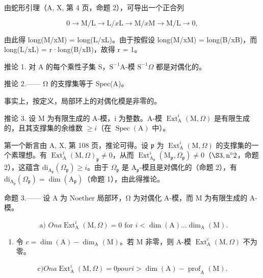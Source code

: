 由蛇形引理（A, X, 第 4 页，命题 2），可导出一个正合列

\[
0 \rightarrow \mathrm{M} / \mathrm{L} \longrightarrow \mathrm{L} / x \mathrm{L} \longrightarrow \mathrm{M} / x \mathrm{M} \longrightarrow \mathrm{M} / \mathrm{L} \rightarrow 0,
\]

由此得 long(M/xM) = long(L/xL)。由于按假设 long(M/xM) = long(B/xB)，而 long(L/xL) = r·long(B/xB)，故得 r = 1。

推论 1. 对 A 的每个乘性子集 S，\(\mathrm{S}^{-1}\mathrm{A}\)-模 \(\mathrm{S}^{-1}\Omega\) 都是对偶化的。

推论 2.—— Ω 的支撑集等于 Spec(A)。

事实上，按定义，局部环上的对偶化模是非零的。

推论 3. 设 M 为有限生成的 A-模，i 为整数。A-模 \(\operatorname{Ext}_{\mathrm{A}}^{i}(\mathrm{M},\Omega)\) 是有限生成的，且其支撑集的余维数 \(\geqslant i\)（在 \(\operatorname{Spec}(\mathrm{A})\) 中）。

第一个断言由 A, X, 第 108 页，推论可得。设 \(\mathfrak{p}\) 为 \(\operatorname{Ext}_{\mathrm{A}}^{i}(\mathrm{M},\Omega)\) 的支撑集的一个素理想。有 \(\operatorname{Ext}_{\mathrm{A}}^{i}(\mathrm{M},\Omega)_{\mathfrak{p}} \neq 0\)，从而 \(\operatorname{Ext}_{\mathrm{A}_{\mathfrak{p}}}^{i}(\mathrm{M}_{\mathfrak{p}},\Omega_{\mathfrak{p}}) \neq 0\)（\(\S 3, \mathrm{n}^{\circ}2\)，命题 2），这蕴含 \(\mathrm{di}_{\mathrm{A}_{\mathfrak{p}}}(\Omega_{\mathfrak{p}}) \geqslant i\)。由于 \(\Omega_{\mathfrak{p}}\) 是 \(\mathrm{A}_{\mathfrak{p}}\)-模且是对偶化的（命题 2），有 \(\mathrm{di}_{\mathrm{A}_{\mathfrak{p}}}(\Omega_{\mathfrak{p}}) = \dim(\mathrm{A}_{\mathfrak{p}})\)（命题 1），由此得推论。

命题 3.—— 设 A 为 Noether 局部环，Ω 为对偶化 A-模，而 M 为有限生成的 A-模。

\[
\text { a) } O n a \operatorname{Ext} _ {\mathrm{A}} ^ {i} (\mathrm{M}, \Omega) = 0 \text { for } i <   \dim (\mathrm{A}) \dots \dim_ {\mathrm{A}} (\mathrm{M}).
\]

\begin{enumerate}
\def\labelenumi{\alph{enumi})}
\setcounter{enumi}{1}
\tightlist
\item
  令 \(c = \dim(\mathrm{A}) - \dim_{\mathrm{A}}(\mathrm{M})\)。若 M 非零，则 A-模 \(\operatorname{Ext}_{\mathrm{A}}^{c}(\mathrm{M}, \Omega)\) 不为零。
\end{enumerate}

\[
\mathrm{c)} O n a \operatorname{Ext} _ {\mathrm{A}} ^ {i} (\mathrm{M}, \Omega) = 0 p o u r i > \dim (\mathrm{A}) - \operatorname{prof} _ {\mathrm{A}} (\mathrm{M}).
\]

